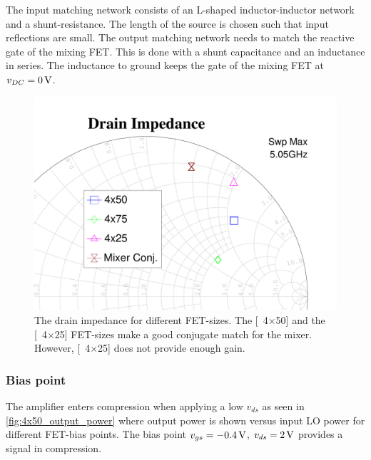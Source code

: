 	The input matching network consists of an L-shaped inductor-inductor network and a shunt-resistance. The length of the source is chosen such that input reflections are small. The output matching network needs to match the reactive gate of the mixing FET. This is done with a shunt capacitance and an inductance in series. The inductance to ground keeps the gate of the mixing FET at $v_{DC}=\unit[0]{V}$.
			\begin{figure}[hbt!]
				\centering
				\includegraphics[width=1.0\textwidth]{fig/amplifiers/lo/FET_size_S22_zoom}
				\caption[Drain impedance for different FET's.]{The drain impedance for different FET-sizes. The \unit[4$\times$50]{\mum} and the \unit[4$\times$25]{\mum} FET-sizes make a good conjugate match for the mixer. However, \unit[4$\times$25]{\mum} does not provide enough gain.} \label{fig:FET_size_S22}
			\end{figure}

		\subsubsection{Bias point}
			The amplifier enters compression when applying a low $v_{ds}$ as seen in \autoref{fig:4x50_output_power} where output power is shown versus input LO power for different FET-bias points. The bias point $v_{gs}=\unit[-0.4]{V}$, $v_{ds}=\unit[2]{V}$ provides a signal in compression.

